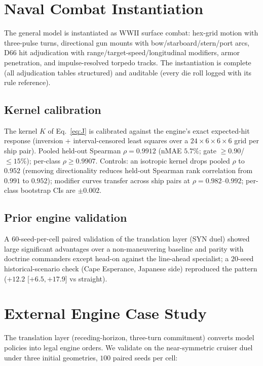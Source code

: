 \documentclass[12pt,a4paper]{article}
\begin{document}
\section{Naval Combat Instantiation}\label{sec:naval}

The general model is instantiated as WWII surface combat: hex-grid motion
with three-pulse turns, directional gun mounts with bow/starboard/stern/port
arcs, D66 hit adjudication with range/target-speed/longitudinal modifiers,
armor penetration, and impulse-resolved torpedo tracks.  The instantiation
is complete (all adjudication tables structured) and auditable (every die
roll logged with its rule reference).

\subsection{Kernel calibration}\label{sec:kernel}
The kernel $K$ of Eq.~\eqref{eq:J} is calibrated against the engine's exact
expected-hit response (inversion + interval-censored least squares over a
$24\times6\times6\times6$ grid per ship pair).  Pooled held-out Spearman
$\rho=0.9912$ (nMAE $5.7\%$; gate $\ge0.90$/$\le15\%$); per-class
$\rho\ge0.9907$.  Controls: an isotropic kernel drops pooled $\rho$ to
$0.952$ (removing directionality reduces held-out Spearman rank
correlation from $0.991$ to $0.952$);
modifier curves transfer across ship pairs at $\rho=0.982$--$0.992$;
per-class bootstrap CIs are $\pm0.002$.

\subsection{Prior engine validation}
A $60$-seed-per-cell paired validation of the translation layer (SYN
duel) showed large significant advantages over a non-maneuvering baseline
and parity with doctrine commanders except head-on against the
line-ahead specialist; a $20$-seed historical-scenario check (Cape
Esperance, Japanese side) reproduced the pattern ($+12.2$ [$+6.5,+17.9$]
vs straight).

\section{External Engine Case Study}\label{sec:validation}

The translation layer (receding-horizon, three-turn commitment) converts
model policies into legal engine orders.  We validate on the near-symmetric
cruiser duel under three initial geometries, $100$ paired seeds per cell:
\end{document}
